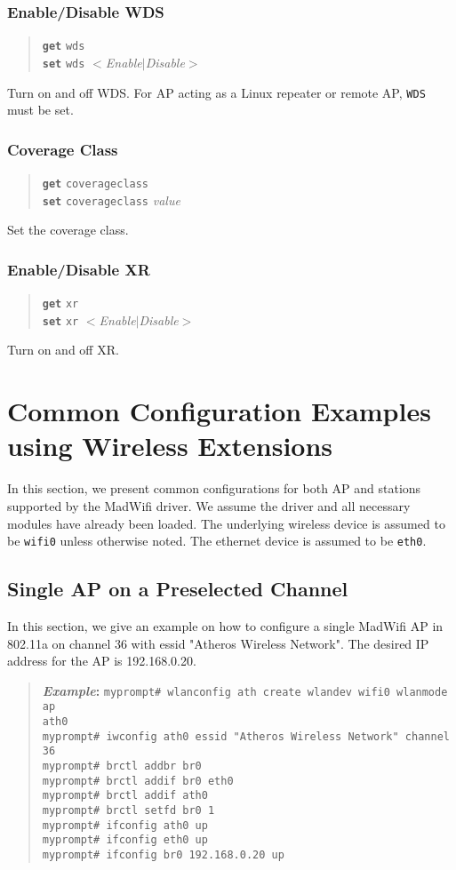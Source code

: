 \documentclass[10pt,fullpage]{article}
\newcommand{\mytt}[1]{{\texttt{#1}}}
\newcommand{\bv}{\begin{verse}}
\newcommand{\ev}{\end{verse}}
\newcommand{\cmd}[1]{{\texttt{myprompt\# #1}}}
\newcommand{\clicmd}[1]{{\textbf{\texttt{#1}}}}
\newcommand{\cliparam}[1]{{\texttt{#1}}}
\newcommand{\clival}[1]{{\emph{#1}}}
\newenvironment{example}{\begin{quote}\textbf{\textit{Example}:}}{\end{quote}}
\begin{document}
\subsubsection{Enable/Disable WDS}
\bv
\clicmd{get} \cliparam{wds}\\
\clicmd{set} \cliparam{wds} $<$\clival{Enable}$|$\clival{Disable}$>$
\ev
Turn on and off WDS. For AP acting as a Linux repeater or remote AP,
\cliparam{WDS} must be set.

\subsubsection{Coverage Class}
\bv
\clicmd{get} \cliparam{coverageclass}\\
\clicmd{set} \cliparam{coverageclass} \clival{value}
\ev
Set the coverage class.

\subsubsection{Enable/Disable XR}
\bv
\clicmd{get} \cliparam{xr}\\
\clicmd{set} \cliparam{xr} $<$\clival{Enable}$|$\clival{Disable}$>$
\ev
Turn on and off XR.

\section{Common Configuration Examples using Wireless Extensions}
In this section, we present common configurations for both AP and
stations supported by the MadWifi driver.  We assume the driver and
all necessary modules have already been loaded.  The underlying
wireless device is assumed to be \mytt{wifi0} unless otherwise noted.
The ethernet device is assumed to be \mytt{eth0}.


\subsection{Single AP on a Preselected Channel}
In this section, we give an example on how to configure a single
MadWifi AP in 802.11a on channel 36 with essid "Atheros Wireless
Network". The desired IP address for the AP is 192.168.0.20.
\begin{example}
  \cmd{wlanconfig ath create wlandev wifi0 wlanmode ap}\\
  \mytt{ath0}\\
  \cmd{iwconfig ath0 essid "Atheros Wireless Network" channel 36}\\
  \cmd{brctl addbr br0}\\
  \cmd{brctl addif br0 eth0}\\
  \cmd{brctl addif ath0}\\
  \cmd{brctl setfd br0 1}\\
  \cmd{ifconfig ath0 up}\\
  \cmd{ifconfig eth0 up}\\
  \cmd{ifconfig br0 192.168.0.20 up}
\end{example}
\end{document}
